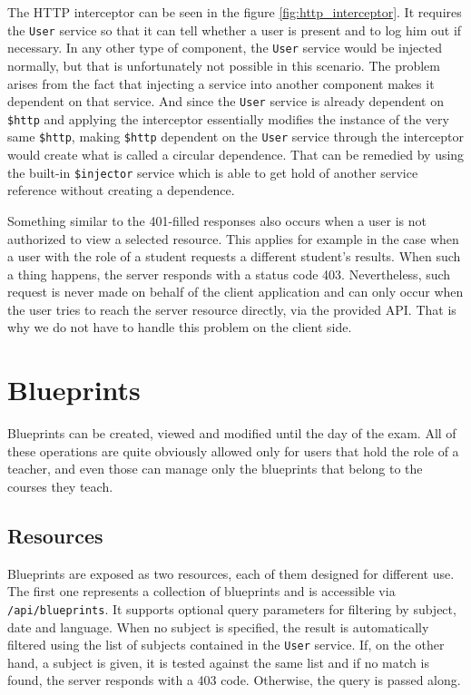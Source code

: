 \documentclass[thesis=M,english,hidelinks]{FITthesis}[2012/10/20]
\newcommand{\code}{\texttt}
\begin{document}
The HTTP interceptor can be seen in the figure \ref{fig:http_interceptor}. It requires the \code{User} service so that it can tell whether a user is present and to log him out if necessary. In any other type of component, the \code{User} service would be injected normally, but that is unfortunately not possible in this scenario. The problem arises from the fact that injecting a service into another component makes it dependent on that service. And since the \code{User} service is already dependent on \code{\$http} and applying the interceptor essentially modifies the instance of the very same \code{\$http}, making \code{\$http} dependent on the \code{User} service through the interceptor would create what is called a circular dependence. That can be remedied by using the built-in \code{\$injector} service which is able to get hold of another service reference without creating a dependence.

Something similar to the 401-filled responses also occurs when a user is not authorized to view a selected resource. This applies for example in the case when a user with the role of a student requests a different student's results. When such a thing happens, the server responds with a status code 403. Nevertheless, such request is never made on behalf of the client application and can only occur when the user tries to reach the server resource directly, via the provided API. That is why we do not have to handle this problem on the client side.

  \section{Blueprints}

Blueprints can be created, viewed and modified until the day of the exam. All of these operations are quite obviously allowed only for users that hold the role of a teacher, and even those can manage only the blueprints that belong to the courses they teach.

    \subsection{Resources}

Blueprints are exposed as two resources, each of them designed for different use. The first one represents a collection of blueprints and is accessible via \code{/api/blueprints}. It supports optional query parameters for filtering by subject, date and language. When no subject is specified, the result is automatically filtered using the list of subjects contained in the \code{User} service. If, on the other hand, a subject is given, it is tested against the same list and if no match is found, the server responds with a 403 code. Otherwise, the query is passed along.
\end{document}
